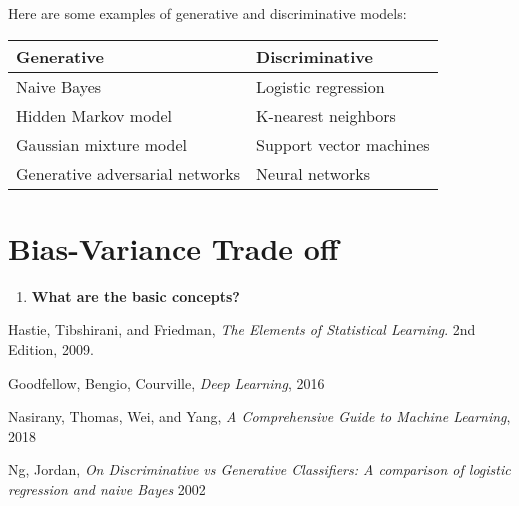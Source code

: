 \documentclass{article}
\begin{document}
\begin{enumerate}
    \noindent 
    \smallbreak
    Here are some examples of generative and discriminative models:
    \begin{center}
      \begin{tabular}{ l l }
        \hline
        \textbf{Generative} & \textbf{Discriminative} \\
        \hline
        Naive Bayes & Logistic regression \\
        Hidden Markov model & K-nearest neighbors \\ 
        Gaussian mixture model & Support vector machines \\
        Generative adversarial networks & Neural networks \\ 
        \hline
      \end{tabular}
    \end{center}
    
\end{enumerate}
\pagebreak

\section{Bias-Variance Trade off}
\noindent
\begin{enumerate}
    \item \textbf{What are the basic concepts?}
    \noindent 
    \smallbreak
    
\end{enumerate}


\begin{thebibliography}{}
Hastie, Tibshirani, and Friedman,
\emph{The Elements of Statistical Learning}.
2nd Edition,
2009.

Goodfellow, Bengio, Courville,
\emph{Deep Learning},
2016

Nasirany, Thomas, Wei, and Yang,
\emph{A Comprehensive Guide to Machine Learning},
2018

Ng, Jordan,
\emph{On Discriminative vs Generative Classifiers: A comparison of logistic regression and naive Bayes}
2002

\end{thebibliography}
\end{document}
